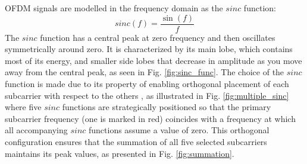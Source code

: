 \documentclass[binding=0.7cm, oneside]{sapthesis}
\begin{document}
OFDM signals are modelled in the frequency domain as the $sinc$ function:
$$sinc(f) = \frac{\sin(f)}{f}$$
The $sinc$ function has a central peak at zero frequency and then oscillates symmetrically around zero. It is characterized by its main lobe,
which contains most of its energy, and smaller side lobes that decrease in amplitude as you move away from the central peak, as seen in Fig.
\ref{fig:sinc_func}. The choice of the $sinc$ function is made due to its property of enabling orthogonal placement of each subcarrier with
respect to the others \cite{EdgeWiFiSensing2022}, as illustrated in Fig. \ref{fig:multiple_sinc} where five $sinc$ functions are strategically
positioned so that the primary subcarrier frequency (one is marked in red) coincides with a frequency at which all accompanying $sinc$ functions
assume a value of zero. This orthogonal configuration ensures that the summation of all five selected subcarriers maintains its peak values,
as presented in Fig. \ref{fig:summation}.
\end{document}
